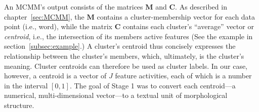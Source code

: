 

An MCMM's output consists of 
the matrices $\mathbf{M}$ and $\mathbf{C}$. As described in chapter~\ref{sec:MCMM}, the $\mathbf{M}$ contains a cluster-membership vector for each data point (i.e., word), while the matrix $\mathbf{C}$ contains each cluster's ``average'' vector or \emph{centroid}, i.e., the intersection of its members active features (See the example in section~\ref{subsec:example}.)
A cluster's centroid thus concisely expresses the relationship between the cluster's members, which, ultimately, is the cluster's meaning. 
Cluster centroids can therefore be used as cluster labels. In our case, however, a centroid is a vector of $J$ feature activities, each of which is a number in the interval $[0,1]$. 
The goal of Stage 1 was to convert each centroid---a numerical, multi-dimensional vector---to a textual unit of morphological structure.

